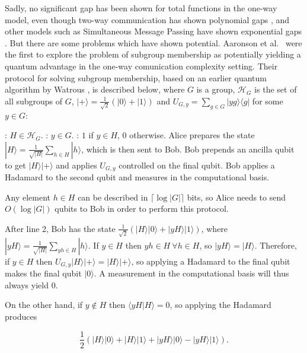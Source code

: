 \documentclass[a4paper]{article}
\begin{document}
        Sadly, no significant gap has been shown for total functions in the one-way model, even though two-way communication has shown polynomial gaps \cite{Buhrman:1998:QVC:276698.276713}, and other models such as Simultaneous Message Passing have shown exponential gaps \cite{PhysRevLett.87.167902}. But there are some problems which have shown potential. Aaronson et al.~\cite{0902.3175} were the first to explore the problem of subgroup membership as potentially yielding a quantum advantage in the one-way comunication complexity setting. Their protocol for solving subgroup membership, based on an earlier quantum algorithm by Watrous \cite{Watrous:2000:SQP:795666.796590}, is described below, where $G$ is a group, $\mathscr{H}_G$ is the set of all subgroups of $G$, $|+\rangle = \frac{1}{\sqrt{2}}(|0\rangle + |1\rangle)$ and $U_{G, y} = \sum_{g \in G}|yg\rangle\langle g|$ for some $y \in G$:

        \begin{codebox}
            \zi {}: $H \in \mathscr{H}_G$.
            \zi {}: $y \in G$.
            \zi {}: $1$ if $y \in H$, $0$ otherwise.
            \li Alice prepares the state $|H\rangle = \frac{1}{\sqrt{|H|}}\sum_{h \in H}|h\rangle$, which is then sent to Bob.
            \li Bob prepends an ancilla qubit to get $|H\rangle|+\rangle$ and applies $U_{G, y}$ controlled on the final qubit.
            \li Bob applies a Hadamard to the second qubit and measures in the computational basis.
        \end{codebox}

        Any element $h \in H$ can be described in $\lceil\log |G|\rceil$ bits, so Alice needs to send $O(\log |G|)$ qubits to Bob in order to perform this protocol.

        After line 2, Bob has the state $\frac{1}{\sqrt{2}}(|H\rangle|0\rangle + |yH\rangle|1\rangle)$, where $|yH\rangle = \frac{1}{\sqrt{|H|}}\sum_{yh \in H}|h\rangle$. If $y \in H$ then $yh \in H~ \forall h \in H$, so $|yH\rangle = |H\rangle$. Therefore, if $y \in H$ then $U_{G, y}|H\rangle|+\rangle = |H\rangle|+\rangle$, so applying a Hadamard to the final qubit makes the final qubit $|0\rangle$. A measurement in the computational basis will thus always yield $0$.

        On the other hand, if $y \notin H$ then $\langle yH|H\rangle = 0$, so applying the Hadamard produces

        $$\frac{1}{2}(|H\rangle|0\rangle + |H\rangle|1\rangle + |yH\rangle|0\rangle - |yH\rangle|1\rangle).$$
\end{document}
